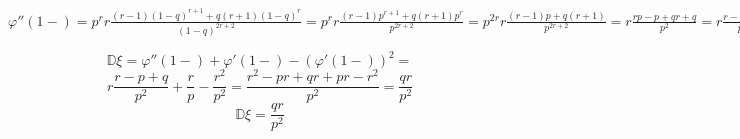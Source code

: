 \documentclass{article}
\begin{document}
\begin{center}
$\varphi''(1-)=p^rr\frac{(r-1)(1-q)^{r+1}+q(r+1)(1-q)^r}{(1-q)^{2r+2}}= 
p^rr\frac{(r-1)p^{r+1}+q(r+1)p^r}{p^{2r+2}}=
p^{2r}r\frac{(r-1)p+q(r+1)}{p^{2r+2}}=r\frac{rp-p+qr+q}{p^2}=r\frac{r-p+q}{p^2}
$    
\end{center}
\[
\mathbb{D\xi}=\varphi''(1-)+\varphi'(1-)-(\varphi'(1-))^2=
\]
\[
r\frac{r-p+q}{p^2}+\frac{r}{p}-\frac{r^2}{p^2}=\frac{r^2-pr+qr+pr-r^2}{p^2}=\frac{qr}{p^2}
\]
\[
\boxed{\mathbb{D}\xi=\frac{qr}{p^2}}
\]
\end{document}
